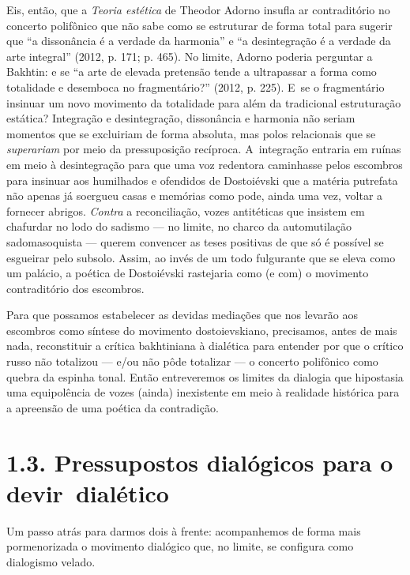 Eis, então, que a \emph{Teoria estética} de Theodor Adorno insufla ar
contraditório no concerto polifônico que não sabe como se estruturar de
forma total para sugerir que ``a dissonância é a verdade da harmonia'' e
``a desintegração é a verdade da arte integral'' (2012, p. 171; p. 465).
No limite, Adorno poderia perguntar a Bakhtin: e se ``a arte de elevada
pretensão tende a ultrapassar a forma como totalidade e desemboca no
fragmentário?'' (2012, p. 225). E~se o fragmentário insinuar um novo
movimento da totalidade para além da tradicional estruturação estática?
Integração e desintegração, dissonância e harmonia não seriam momentos
que se excluiriam de forma absoluta, mas polos relacionais que se
\emph{superariam} por meio da pressuposição recíproca. A~integração
entraria em ruínas em meio à desintegração para que uma voz redentora
caminhasse pelos escombros para insinuar aos humilhados e ofendidos de
Dostoiévski que a matéria putrefata não apenas já soergueu casas e
memórias como pode, ainda uma vez, voltar a fornecer abrigos.
\emph{Contra} a reconciliação, vozes antitéticas que insistem em
chafurdar no lodo do sadismo --- no limite, no charco da automutilação
sadomasoquista --- querem convencer as teses positivas de que só é
possível se esgueirar pelo subsolo. Assim, ao invés de um todo
fulgurante que se eleva como um palácio, a poética de Dostoiévski
rastejaria como (e com) o movimento contraditório dos escombros.

Para que possamos estabelecer as devidas mediações que nos levarão aos
escombros como síntese do movimento dostoievskiano, precisamos, antes de
mais nada, reconstituir a crítica bakhtiniana à dialética para entender
por que o crítico russo não totalizou --- e/ou não pôde totalizar --- o
concerto polifônico como quebra da espinha tonal. Então entreveremos os
limites da dialogia que hipostasia uma equipolência de vozes (ainda)
inexistente em meio à realidade histórica para a apreensão de uma
poética da contradição.

\section{1.3. Pressupostos dialógicos para o devir~dialético}

Um passo atrás para darmos dois à frente: acompanhemos de forma mais
pormenorizada o movimento dialógico que, no limite, se configura como
dialogismo velado.


